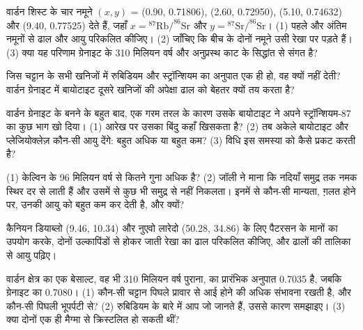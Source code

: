 \begin{exercise}[$\star\star$]\label{exo:g12:age-of-the-earth:7}
वार्डन शिस्ट के चार नमूने $(x, y)$ = (0.90, 0.71806),
(2.60, 0.72950), (5.10, 0.74632) और (9.40, 0.77525) देते हैं, जहाँ $x =
{}^{87}\mathrm{Rb}/^{86}\mathrm{Sr}$ और $y = {}^{87}\mathrm{Sr}/^{86}\mathrm{Sr}$।
(1) पहले और अंतिम नमूनों से ढाल और आयु परिकलित कीजिए।
(2) जाँचिए कि बीच के दोनों नमूने उसी रेखा पर पड़ते हैं। (3) क्या यह
परिणाम ग्रेनाइट के 310 मिलियन वर्ष और अनुप्रस्थ काट के सिद्धांत से
संगत है?
\end{exercise}

\begin{exercise}[$\star\star$]\label{exo:g12:age-of-the-earth:8}
जिस चट्टान के सभी खनिजों में रुबिडियम और स्ट्रॉन्शियम का अनुपात एक ही हो, वह
 क्यों नहीं देती? वार्डन ग्रेनाइट में बायोटाइट दूसरे खनिजों की अपेक्षा
ढाल को बेहतर क्यों तय करता है?
\end{exercise}

\begin{exercise}[$\star\star$]\label{exo:g12:age-of-the-earth:9}
वार्डन ग्रेनाइट के बनने के बहुत बाद, एक गरम तरल के कारण उसके बायोटाइट ने
अपने स्ट्रॉन्शियम-87 का कुछ भाग खो दिया। (1)  आरेख पर उसका बिंदु कहाँ खिसकता है?
(2) तब अकेले बायोटाइट और प्लेजियोक्लेज़ कौन-सी आयु देंगे: बहुत अधिक या
बहुत कम? (3)  विधि इस समस्या को कैसे प्रकट करती है?
\end{exercise}

\begin{exercise}[$\star\star$]\label{exo:g12:age-of-the-earth:10}
(1)  केल्विन के 96 मिलियन वर्ष से कितने गुना अधिक
है? (2) जॉली ने माना कि नदियाँ समुद्र तक नमक स्थिर
दर से लाती हैं और उसमें से कुछ भी समुद्र से नहीं निकलता। इनमें से कौन-सी मान्यता, ग़लत होने पर,
उनकी आयु को बहुत कम कर देती है, और क्यों?
\end{exercise}

\begin{exercise}[$\star\star$]\label{exo:g12:age-of-the-earth:11}
कैनियन डियाब्लो (9.46, 10.34) और नुएवो लारेदो
(50.28, 34.86) के लिए पैटरसन के मानों का उपयोग करके, दोनों उल्कापिंडों से होकर जाती रेखा का ढाल
परिकलित कीजिए, और ढालों की तालिका से आयु पढ़िए।
\end{exercise}

\begin{exercise}[$\star\star\star$]\label{exo:g12:age-of-the-earth:12}
वार्डन क्षेत्र का एक बेसाल्ट, वह भी 310 मिलियन वर्ष पुराना, का प्रारंभिक
अनुपात 0.7035 है, जबकि ग्रेनाइट का 0.7080। (1) कौन-सी चट्टान पिघले प्रावार से
आई होने की अधिक संभावना रखती है, और कौन-सी पिघली भूपर्पटी से? (2) रुबिडियम के बारे में
आप जो जानते हैं, उससे कारण समझाइए। (3) क्या दोनों एक ही मैग्मा से
क्रिस्टलित हो सकती थीं?
\end{exercise}

